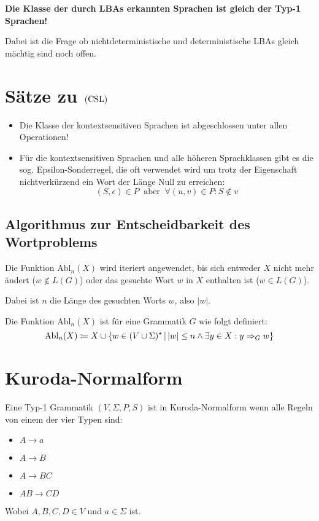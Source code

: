 \textbf{Die Klasse der durch LBAs erkannten Sprachen ist gleich der Typ-1 Sprachen!}

Dabei ist die Frage ob nichtdeterministische und deterministische LBAs gleich mächtig sind noch offen.



\section{Sätze zu $\mathrm{(CSL)}$}
\begin{itemize}
	\item Die Klasse der kontextsensitiven Sprachen ist abgeschlossen unter allen Operationen!
	\item Für die kontextsensitiven Sprachen und alle höheren Sprachklassen gibt es die sog. Epsilon-Sonderregel, die oft verwendet wird um trotz der Eigenschaft nichtverkürzend ein Wort der Länge Null zu erreichen:
	\begin{equation*}
		(S,\epsilon)\in P \ \text{ aber }\  \forall (u,v)\in P:S\not\in v
	\end{equation*}
\end{itemize}

\subsection{Algorithmus zur Entscheidbarkeit des Wortproblems}
Die Funktion $\mathrm{Abl}_n(X)$ wird iteriert angewendet, bis sich entweder $X$ nicht mehr ändert ($w\not\in L(G)$) oder das gesuchte Wort $w$ in $X$ enthalten ist ($w\in L(G)$).

Dabei ist $n$ die Länge des gesuchten Worts $w$, also $|w|$.

Die Funktion $\mathrm{Abl}_n(X)$ ist für eine Grammatik $G$ wie folgt definiert:
\begin{equation*}
	\mathrm{Abl}_n(X)\coloneqq X\cup\left\{ w\in(V\cup\Sigma)^\star \,\middle|\, |w|\leq n \wedge \exists y\in X:y\Rightarrow_G w \right\}
\end{equation*}


\section{Kuroda-Normalform}
Eine Typ-1 Grammatik $(V,\Sigma, P, S)$ ist in Kuroda-Normalform wenn alle Regeln von einem der vier Typen sind:
\begin{itemize}
	\item $A\rightarrow a$
	\item $A\rightarrow B$
	\item $A\rightarrow BC$
	\item $AB\rightarrow CD$
\end{itemize}
Wobei $A,B,C,D\in V$ und $a\in \Sigma$ ist.

